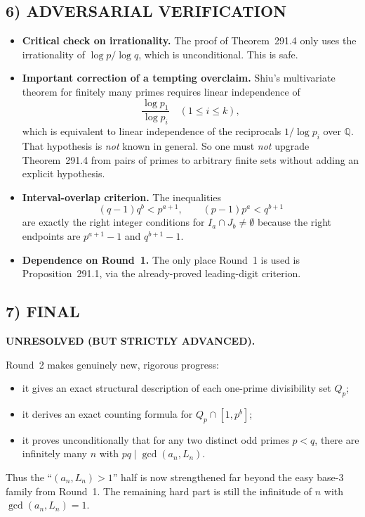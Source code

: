 \subsection*{6) ADVERSARIAL VERIFICATION}
\begin{itemize}
	\item \textbf{Critical check on irrationality.} The proof of Theorem~291.4 only uses the irrationality of $\log p/\log q$, which is unconditional. This is safe.
	
	\item \textbf{Important correction of a tempting overclaim.} Shiu's multivariate theorem for finitely many primes requires linear independence of
	\[
	\frac{\log p_1}{\log p_i}
	\quad (1\le i\le k),
	\]
	which is equivalent to linear independence of the reciprocals $1/\log p_i$ over $\mathbb Q$. That hypothesis is \emph{not} known in general. So one must \emph{not} upgrade Theorem~291.4 from pairs of primes to arbitrary finite sets without adding an explicit hypothesis.
	
	\item \textbf{Interval-overlap criterion.} The inequalities
	\[
	(q-1)q^b<p^{a+1},
	\qquad
	(p-1)p^a<q^{b+1}
	\]
	are exactly the right integer conditions for $I_a\cap J_b\neq\emptyset$ because the right endpoints are $p^{a+1}-1$ and $q^{b+1}-1$.
	
	\item \textbf{Dependence on Round~1.} The only place Round~1 is used is Proposition~291.1, via the already-proved leading-digit criterion.
\end{itemize}

\subsection*{7) FINAL}
\textbf{UNRESOLVED (BUT STRICTLY ADVANCED).}

Round~2 makes genuinely new, rigorous progress:

\begin{itemize}
	\item it gives an exact structural description of each one-prime divisibility set $Q_p$;
	\item it derives an exact counting formula for $Q_p\cap[1,p^b]$;
	\item it proves unconditionally that for any two distinct odd primes $p<q$, there are infinitely many $n$ with $pq\mid \gcd(a_n,L_n)$.
\end{itemize}

Thus the ``$(a_n,L_n)>1$'' half is now strengthened far beyond the easy base-$3$ family from Round~1. The remaining hard part is still the infinitude of $n$ with $\gcd(a_n,L_n)=1$.

